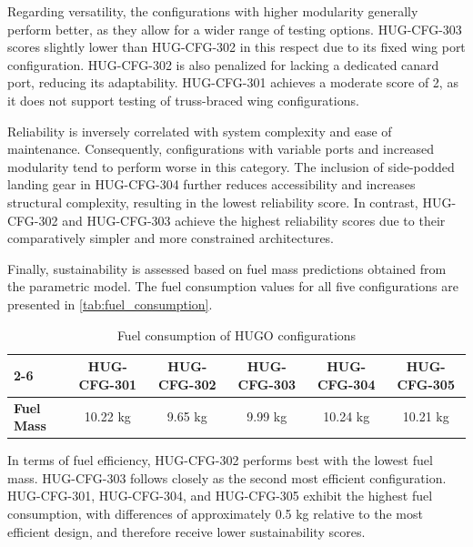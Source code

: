 Regarding versatility, the configurations with higher modularity generally perform better, as they allow for a wider range of testing options. HUG-CFG-303 scores slightly lower than HUG-CFG-302 in this respect due to its fixed wing port configuration. HUG-CFG-302 is also penalized for lacking a dedicated canard port, reducing its adaptability. HUG-CFG-301 achieves a moderate score of 2, as it does not support testing of truss-braced wing configurations.

Reliability is inversely correlated with system complexity and ease of maintenance. Consequently, configurations with variable ports and increased modularity tend to perform worse in this category. The inclusion of side-podded landing gear in HUG-CFG-304 further reduces accessibility and increases structural complexity, resulting in the lowest reliability score. In contrast, HUG-CFG-302 and HUG-CFG-303 achieve the highest reliability scores due to their comparatively simpler and more constrained architectures.

Finally, sustainability is assessed based on fuel mass predictions obtained from the parametric model. The fuel consumption values for all five configurations are presented in \autoref{tab:fuel_consumption}.

\begin{table}[H]
\centering
\caption{Fuel consumption of HUGO configurations}
\label{tab:fuel_consumption}

\begin{tabular}{|l|c|c|c|c|c|}
\cline{2-6}
\multicolumn{1}{c|}{} 
& \textbf{HUG-CFG-301} & \textbf{HUG-CFG-302} & \textbf{HUG-CFG-303} & \textbf{HUG-CFG-304} & \textbf{HUG-CFG-305} \\
\hline
\textbf{Fuel Mass} & 10.22 kg & 9.65 kg & 9.99 kg & 10.24 kg & 10.21 kg \\
\hline
\end{tabular}

\end{table}

In terms of fuel efficiency, HUG-CFG-302 performs best with the lowest fuel mass. HUG-CFG-303 follows closely as the second most efficient configuration. HUG-CFG-301, HUG-CFG-304, and HUG-CFG-305 exhibit the highest fuel consumption, with differences of approximately 0.5 kg relative to the most efficient design, and therefore receive lower sustainability scores.

